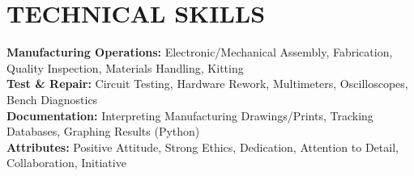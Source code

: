 \documentclass[letterpaper,11pt]{article}
\begin{document}
\section{TECHNICAL SKILLS}
 \begin{itemize}[leftmargin=0.15in, label={}]
    \small{\item{
     \textbf{Manufacturing Operations:} Electronic/Mechanical Assembly, Fabrication, Quality Inspection, Materials Handling, Kitting \\
     \textbf{Test \& Repair:} Circuit Testing, Hardware Rework, Multimeters, Oscilloscopes, Bench Diagnostics \\
     \textbf{Documentation:} Interpreting Manufacturing Drawings/Prints, Tracking Databases, Graphing Results (Python) \\
     \textbf{Attributes:} Positive Attitude, Strong Ethics, Dedication, Attention to Detail, Collaboration, Initiative
    }}
 \end{itemize}


\end{document}
